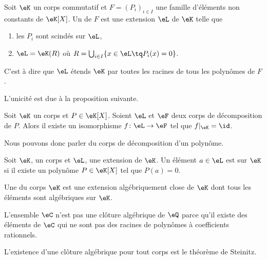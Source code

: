 \begin{definition}
    Soit \( \eK\) un corps commutatif et \( F=(P_i)_{i\in I}\) une famille d'éléments non constants de \( \eK[X]\). Un  de \( F\) est une extension \( \eL\) de \( \eK\) telle que
    \begin{enumerate}
        \item
            les \( P_i\) sont scindés sur \( \eL\),
        \item
            \( \eL=\eK(R)\) où \( R=\bigcup_{i\in I}\{ x\in\eL\tq P_i(x)=0 \}\).
    \end{enumerate}
    C'est à dire que \( \eL\) étends \( \eK\) par toutes les racines de tous les polynômes de \( F\).
\end{definition}

L'unicité est due à la proposition suivante.
\begin{proposition}     \label{PropTMkfyM}
    Soit \( \eK\) un corps et \( P\in\eK[X]\). Soient \( \eL\) et \( \eF\) deux corps de décomposition de \( P\). Alors il existe un isomorphisme \( f\colon \eL\to \eF\) tel que \( f|_{\eK}=\id\).
\end{proposition}
Nous pouvons donc parler du corps de décomposition d'un polynôme.

Soit \( \eK\), un corps et \( \eL\), une extension de \( \eK\). Un élément \( a\in \eL\) est  sur \( \eK\) si il existe un polynôme \( P\in \eK[X]\) tel que \( P(a)=0\).

Une  du corps \( \eK\) est une extension algébriquement close de \( \eK\) dont tous les éléments sont algébriques sur \( \eK\).

\begin{remark}
    L'ensemble \( \eC\) n'est pas une clôture algébrique de \( \eQ\) parce qu'il existe des éléments de \( \eC\) qui ne sont pas des racines de polynômes à coefficients rationnels.
\end{remark}
L'existence d'une clôture algébrique pour tout corps est le théorème de Steinitz.

